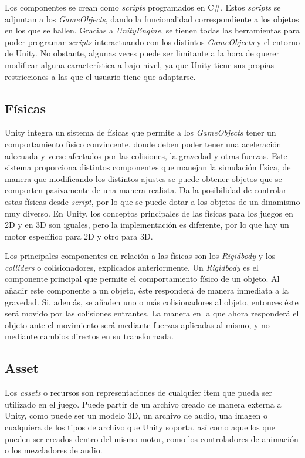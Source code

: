 Los componentes se crean como \textit{scripts} programados en C\#. Estos \textit{scripts} se adjuntan a los \textit{GameObjects}, dando la funcionalidad correspondiente a los objetos en los que se hallen. Gracias a \textit{UnityEngine}, se tienen todas las herramientas para poder programar \textit{scripts} interactuando con los distintos \textit{GameObjects} y el entorno de Unity. No obstante, algunas veces puede ser limitante a la hora de querer modificar alguna característica a bajo nivel, ya que Unity tiene sus propias restricciones a las que el usuario tiene que adaptarse.

\subsection{Físicas}

Unity integra un sistema de físicas que permite a los \textit{GameObjects} tener un comportamiento físico convincente, donde deben poder tener una aceleración adecuada y verse afectados por las colisiones, la gravedad y otras fuerzas. Este sistema proporciona distintos componentes que manejan la simulación física, de manera que modificando los distintos ajustes se puede obtener objetos que se comporten pasivamente de una manera realista. Da la posibilidad de controlar estas físicas desde \textit{script}, por lo que se puede dotar a los objetos de un dinamismo muy diverso. En Unity, los conceptos principales de las físicas para los juegos en 2D y en 3D son iguales, pero la implementación es diferente, por lo que hay un motor específico para 2D y otro para 3D.

Los principales componentes en relación a las físicas son los \textit{Rigidbody} y los \textit{colliders} o colisionadores, explicados anteriormente. Un \textit{Rigidbody} es el componente principal que permite el comportamiento físico de un objeto. Al añadir este componente a un objeto, éste responderá de manera inmediata a la gravedad. Si, además, se añaden uno o más colisionadores al objeto, entonces éste será movido por las colisiones entrantes. La manera en la que ahora responderá el objeto ante el movimiento será mediante fuerzas aplicadas al mismo, y no mediante cambios directos en su transformada.

\subsection{Asset}

Los \textit{assets} o recursos son representaciones de cualquier item que pueda ser utilizado en el juego. Puede partir de un archivo creado de manera externa a Unity, como puede ser un modelo 3D, un archivo de audio, una imagen o cualquiera de los tipos de archivo que Unity soporta, así como aquellos que pueden ser creados dentro del mismo motor, como los controladores de animación o los mezcladores de audio.

